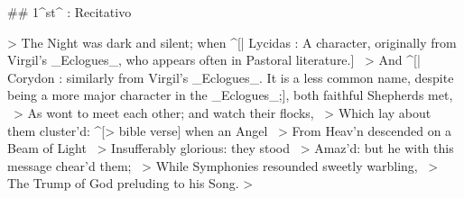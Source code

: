 ## 1^st^ \mvmt: Recitativo


> The Night was dark and silent; when ^[| Lycidas : A character, originally
from Virgil's _Eclogues_, who appears often in Pastoral literature.] \
> And ^[| Corydon : similarly from Virgil's _Eclogues_. It is a less common name, despite being a more major character in the _Eclogues_;], both faithful Shepherds met,  \
> As wont to meet each other; and watch their flocks,  \
> Which lay about them cluster’d: ^[> bible verse] when an Angel  \
> From Heav’n descended on a Beam of Light  \
> Insufferably glorious: they stood  \
> Amaz’d: but he with this message chear’d them;  \
> While Symphonies resounded sweetly warbling,  \
> The Trump of God preluding to his Song.
> \setlength\linenumbersep{-3 em}
